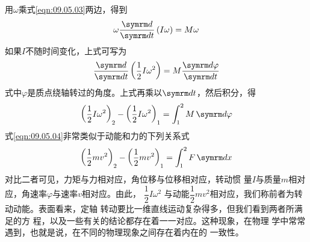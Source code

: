 用$ \omega $乘式\eqref{eqn:09.05.03}两边，得到
\begin{equation*}
  \omega \frac { \dif } { \dif t } \left( I \omega \right) = M \omega
\end{equation*}
如果$ I $不随时间变化，上式可写为
\begin{equation*}
  \frac { \dif } { \dif t } \left( \frac { 1 } { 2 } I \omega ^ { 2 } \right) = M \frac { \dif \varphi } { \dif t }
\end{equation*}
式中$ \varphi $是质点绕轴转过的角度。上式再乘以$ \dif t $，然后积分，得
\begin{equation}\label{eqn:09.05.04}
  { \left( \frac { 1 } { 2 } I \omega ^ { 2 } \right) } _ { 2 } - { \left( \frac { 1 } { 2 } I \omega ^ { 2 } \right) } _ { 1 } = \int _ 1 ^ { 2 } M \dif \varphi
\end{equation}
式\eqref{eqn:09.05.04}非常类似于动能和力的下列关系式
\begin{equation*}
  { \left( \frac { 1 } { 2 } m v ^ { 2 } \right) } _ { 2 } - { \left( \frac { 1 } { 2 } m v ^ { 2 } \right) } _ { 1 } = \int _ { 1 } ^ { 2 } F \dif x
\end{equation*}
对比二者可见，力矩与力相对应，角位移与位移相对应，转动惯
量$ I $与质量$ m $相对应，角速率$ \varphi $与速率$ v $相对应。由此，
$ \dfrac { 1 } { 2 } I \omega ^ { 2 } $
与动能$ \dfrac { 1 } { 2 } m v ^ { 2 } $相对应，我们称前者为转动动能。表面看来，定轴
转动要比一维直线运动复杂得多，但我们看到两者所满足的方
程，以及一些有关的结论都存在着一一对应。这种现象，在物理
学中常常遇到，也就是说，在不同的物理现象之间存在着内在的
一致性。
